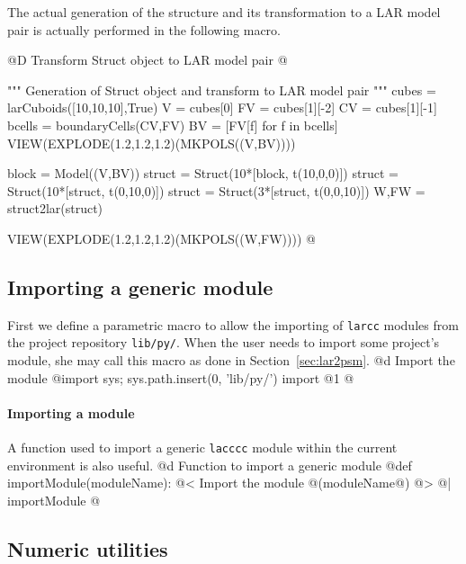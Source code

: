 \documentclass[11pt,oneside]{article}    %
\begin{document}
The actual generation of the structure and its transformation to a LAR model pair is actually performed in the following macro.

@D Transform Struct object to LAR model pair
@{""" Generation of Struct object and transform to LAR model pair """
cubes = larCuboids([10,10,10],True)
V = cubes[0]
FV = cubes[1][-2]
CV = cubes[1][-1]
bcells = boundaryCells(CV,FV)
BV = [FV[f] for f in bcells]
VIEW(EXPLODE(1.2,1.2,1.2)(MKPOLS((V,BV))))

block = Model((V,BV))
struct = Struct(10*[block, t(10,0,0)])
struct = Struct(10*[struct, t(0,10,0)])
struct = Struct(3*[struct, t(0,0,10)])
W,FW = struct2lar(struct)

VIEW(EXPLODE(1.2,1.2,1.2)(MKPOLS((W,FW))))
@}



\appendix
\subsection{Importing a generic module}
First we define a parametric macro to allow the importing of \texttt{larcc} modules from the project repository \texttt{lib/py/}. When the user needs to import some project's module, she may call this macro as done in Section~\ref{sec:lar2psm}.
@d Import the module
@{import sys; sys.path.insert(0, 'lib/py/')
import @1
@}

\paragraph{Importing a module} A function used to import a generic \texttt{lacccc} module within the current environment is also useful.
@d Function to import a generic module
@{def importModule(moduleName):
    @< Import the module @(moduleName@) @>
@| importModule @}



\subsection{Numeric utilities}
\end{document}
